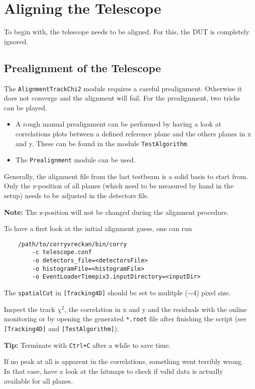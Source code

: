 \section{Aligning the Telescope}
\label{sec:align_tel}
To begin with, the telescope needs to be aligned. 
For this, the DUT is completely ignored.

\subsection*{Prealignment of the Telescope}
The \texttt{AlignmentTrackChi2} module requires a careful prealignment. Otherwise it does not converge and the alignment will fail.
For the prealignment, two tricks can be played.
\begin{itemize}
\item A rough manual prealignment can be performed by having a look at correlations plots between a defined reference plane and the others planes in x and y.
These can be found in the module \texttt{TestAlgorithm}.
\item The \texttt{Prealignment} module can be used.
\end{itemize}

Generally, the alignment file from the last testbeam is a solid basis to start from. Only the z-position of all planes (which need to be measured by hand in the setup) needs to be adjusted in the detectors file. 

\textbf{Note:} The z-position will not be changed during the alignment procedure.

To have a first look at the initial alignment guess, one can run
\begin{verbatim}
    /path/to/corryvreckan/bin/corry 
    	-c telescope.conf 
    	-o detectors_file=<detectorsFile> 
    	-o histogramFile=<histogramFile> 
    	-o EventLoaderTimepix3.inputDirectory=<inputDir>
\end{verbatim}

The \texttt{spatialCut} in \texttt{[Tracking4D]} should be set to mulitple ($\sim4$) pixel size.

Inspect the track $\chi^2$, the correlation in x and y and the residuals with the online monitoring or by opening the generated \texttt{*.root} file after finishing the script (see \texttt{[Tracking4D]} and \texttt{[TestAlgorithm]}).

\textbf{Tip:} Terminate \corry with \texttt{Ctrl+C} after a while to save time.

If no peak at all is apparent in the correlations, something went terribly wrong.
In that case, have a look at the hitmaps to check if valid data is actually available for all planes.

